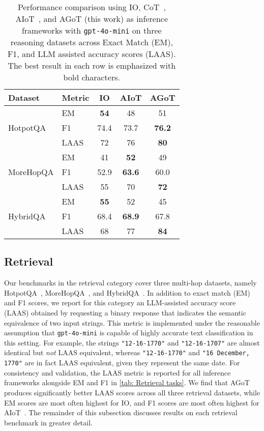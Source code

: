 \documentclass{article}
\begin{document}
\begin{table*}
    \centering
    \begin{tabular}{ll|ccc}
        \toprule
        \textbf{Dataset} & \textbf{Metric} & \textbf{IO} & \textbf{AIoT} & \textbf{AGoT} \\
        \midrule
         \multirow{3}{*}{HotpotQA} 
         & EM & \textbf{54} & 48 & 51 \\
         & F1 & 74.4 & 73.7 & \textbf{76.2} \\
         & LAAS & 72 & 76 & \textbf{80} \\
         \midrule
         \multirow{3}{*}{MoreHopQA}
         & EM & 41 & \textbf{52} & 49 \\
         & F1 & 52.9 & \textbf{63.6} & 60.0 \\
         & LAAS & 55 & 70 & \textbf{72} \\
         \midrule
         \multirow{3}{*}{HybridQA}
         & EM & \textbf{55} & 52 & 45 \\
         & F1 & 68.4 & \textbf{68.9} & 67.8 \\
         & LAAS & 68 & 77 & \textbf{84}\\
        \bottomrule
    \end{tabular}
    \caption{Performance comparison using IO, CoT~\citep{wei2022chain}, AIoT~\citep{radha2024iterationthoughtleveraginginner}, and AGoT (this work) as inference frameworks with \texttt{gpt-4o-mini} on three reasoning datasets across Exact Match (EM), F1, and LLM assisted accuracy scores (LAAS). The best result in each row is emphasized with bold characters.}
    \label{tab: Retrieval tasks}
\end{table*}

\subsection{Retrieval}
Our benchmarks in the retrieval category cover three multi-hop datasets, namely HotpotQA~\citep{yang2018hotpotqadatasetdiverseexplainable}, MoreHopQA~\citep{schnitzler2024morehopqamultihopreasoning}, and HybridQA~\citep{chen2021hybridqadatasetmultihopquestion}. In addition to exact match (EM) and F1 scores, we report for this category an LLM-assisted accuracy score (LAAS) obtained by requesting a binary response that indicates the semantic equivalence of two input strings. This metric is implemented under the reasonable assumption that \texttt{gpt-4o-mini} is capable of highly accurate text classification in this setting. For example, the strings \texttt{"12-16-1770"} and \texttt{"12-16-1707"} are almost identical but \textit{not} LAAS equivalent, whereas \texttt{"12-16-1770"} and \texttt{"16 December, 1770"} are in fact LAAS equivalent, given they represent the same date. For consistency and validation, the LAAS metric is reported for all inference frameworks alongside EM and F1 in \autoref{tab: Retrieval tasks}. We find that AGoT produces significantly better LAAS scores across all three retrieval datasets, while EM scores are most often highest for IO, and F1 scores are most often highest for AIoT~\citep{radha2024iterationthoughtleveraginginner}. The remainder of this subsection discusses results on each retrieval benchmark in greater detail.
\end{document}
